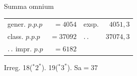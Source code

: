 \par\medskip\noindent Summa omnium
\begin{center}\begin{tabular}{@{}lrlr@{}}
gener. $p.p.p$ & $=4054$ & exsp. & $4051{,}3$\\
class. $p.p.p$ & $=37092$ & $\mathinner{.\,.}$ & $37074{,}3$\\
$\mathinner{.\,.}$ impr. $p.p$ & $=6182$ & &\\
\end{tabular}\end{center}
\noindent Irreg. 18(${}^{*}2^{*}$). 19(${}^{*}3^{*}$). Sa$=37$
